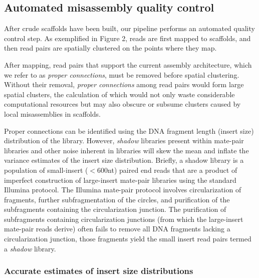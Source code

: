 \documentclass{bioinfo}
\begin{document}
\subsection{Automated misassembly quality control}\label{sec:qc}

After crude scaffolds have been built, our pipeline performs an automated quality control step.
As exemplified in Figure 2, reads are first mapped to scaffolds, and then read pairs are spatially clustered on the
points where they map.

After mapping, read pairs that support the current assembly architecture, which we 
refer to as \emph{proper connections}, must be removed before spatial clustering. Without their removal, \emph{proper connections}
among read pairs would form large spatial clusters, the calculation of which would not only waste considerable 
computational resources but may also obscure or subsume clusters caused by local misassemblies in scaffolds. 

 Proper connections
can be identified using the DNA fragment length (insert size) distribution of the library. However, \emph{shadow} libraries present within 
mate-pair libraries and other noise inherent in libraries will skew the mean and inflate the variance 
estimates of the insert size distribution. Briefly, a shadow library is a population of small-insert ($<$600nt) paired end reads
that are a product of imperfect construction of large-insert
mate-pair libraries using the standard Illumina protocol. The Illumina mate-pair protocol involves circularization of fragments, further subfragmentation of the circles, and purification
of the subfragments containing the circularization junction. 
The purification of subfragments containing circularization junctions (from which the large-insert mate-pair reads derive) 
often fails to remove all DNA fragments lacking a circularization junction, those fragments yield the small insert
read pairs termed a \emph{shadow} library. 

\subsubsection{Accurate estimates of insert size distributions}
\end{document}
